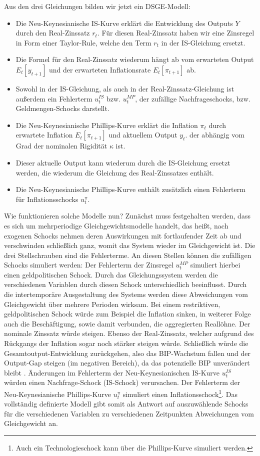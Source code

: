 Aus den drei Gleichungen bilden wir jetzt ein DSGE-Modell:
\begin{itemize}
	\item Die Neu-Keynesianische IS-Kurve erklärt die Entwicklung des Outputs $Y$ durch den Real-Zinssatz $r_t$. Für diesen Real-Zinssatz haben wir eine Zinsregel in Form einer Taylor-Rule, welche den Term $r_t$ in der IS-Gleichung ersetzt.
	\item Die Formel für den Real-Zinssatz wiederum hängt ab vom erwarteten Output $E_t[y_{t+1}]$ und der erwarteten Inflationsrate $E_t[\pi_{t+1}]$ ab.
	\item Sowohl in der IS-Gleichung, als auch in der Real-Zinssatz-Gleichung ist außerdem ein Fehlerterm $u_t^{IS}$ bzw. $u_t^{MP}$, der zufällige Nachfrageschocks, bzw. Geldmengen-Schocks darstellt.
	\item Die Neu-Keynesianische Phillips-Kurve erklärt die Inflation $\pi_t$ durch erwartete Inflation $E_t[\pi_{t+1}]$ und aktuellem Output $y_t$. der abhängig vom Grad der nominalen Rigidität $\kappa$ ist.
	\item Dieser aktuelle Output kann wiederum durch die IS-Gleichung ersetzt werden, die wiederum die Gleichung des Real-Zinssatzes enthält.
	\item Die Neu-Keynesianische Phillips-Kurve enthält zusätzlich einen Fehlerterm für Inflationsschocks $u_t^{\pi}$.
\end{itemize}

Wie funktionieren solche Modelle nun? Zunächst muss festgehalten werden, dass es sich um mehrperiodige Gleichgewichtsmodelle handelt, das heißt, nach exogenen Schocks nehmen deren Auswirkungen mit fortlaufender Zeit ab und verschwinden schließlich ganz, womit das System wieder im Gleichgewicht ist. Die drei Stellschrauben sind die Fehlerterme. An diesen Stellen können die zufälligen Schocks simuliert werden: Der Fehlerterm der Zinsregel $u_t^{MP}$ simuliert hierbei einen geldpolitischen Schock. Durch das Gleichungssystem werden die verschiedenen Variablen durch diesen Schock unterschiedlich beeinflusst. Durch die intertemporäre Ausgestaltung des Systems werden diese Abweichungen vom Gleichgewicht über mehrere Perioden wirksam. Bei einem restriktiven, geldpolitischen Schock würde zum Beispiel die Inflation sinken, in weiterer Folge auch die Beschäftigung, sowie damit verbunden, die aggregierten Reallöhne. Der nominale Zinssatz würde steigen. Ebenso der Real-Zinssatz, welcher aufgrund des Rückgangs der Inflation sogar noch stärker steigen würde. Schließlich würde die Gesamtoutput-Entwicklung zurückgehen, also das BIP-Wachstum fallen und der Output-Gap steigen (im negativen Bereich), da das potenzielle BIP unverändert bleibt \parencite[S. 68f]{Gali2015}. Änderungen im Fehlerterm der Neu-Keynesianischen IS-Kurve $u_t^{IS}$ würden einen Nachfrage-Schock (IS-Schock) verursachen. Der Fehlerterm der Neu-Keynesianische Phillips-Kurve $u_t^{\pi}$ simuliert einen Inflationsschock\footnote{Auch ein Technologieschock kann über die Phillips-Kurve simuliert werden.}. Das vollständig definierte Modell gibt somit als Antwort auf auszuwählende Schocks für die verschiedenen Variablen zu verschiedenen Zeitpunkten Abweichungen vom Gleichgewicht an. 

